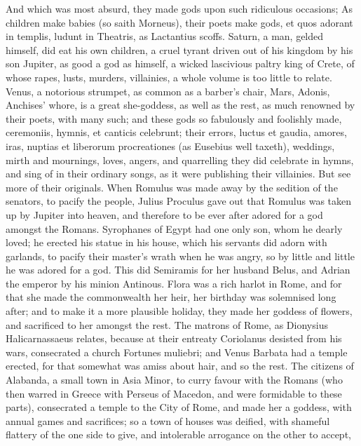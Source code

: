 {And which was most absurd, they made gods upon such ridiculous
occasions; As children make babies (so saith Morneus), their
poets make gods, et quos adorant in templis, ludunt in Theatris, as
Lactantius scoffs. Saturn, a man, gelded himself, did eat his own
children, a cruel tyrant driven out of his kingdom by his son Jupiter,
as good a god as himself, a wicked lascivious paltry king of Crete, of
whose rapes, lusts, murders, villainies, a whole volume is too little
to relate. Venus, a notorious strumpet, as common as a barber's chair,
Mars, Adonis, Anchises' whore, is a great she-goddess, as well as the
rest, as much renowned by their poets, with many such; and these gods
so fabulously and foolishly made, ceremoniis, hymnis, et canticis
celebrunt; their errors, luctus et gaudia, amores, iras, nuptias et
liberorum procreationes (as Eusebius well taxeth), weddings,
mirth and mournings, loves, angers, and quarrelling they did celebrate
in hymns, and sing of in their ordinary songs, as it were publishing
their villainies. But see more of their originals. When Romulus was
made away by the sedition of the senators, to pacify the people,
Julius Proculus gave out that Romulus was taken up by Jupiter
into heaven, and therefore to be ever after adored for a god amongst
the Romans. Syrophanes of Egypt had one only son, whom he dearly loved;
he erected his statue in his house, which his servants did adorn with
garlands, to pacify their master's wrath when he was angry, so by
little and little he was adored for a god. This did Semiramis for her
husband Belus, and Adrian the emperor by his minion Antinous. Flora was
a rich harlot in Rome, and for that she made the commonwealth her heir,
her birthday was solemnised long after; and to make it a more plausible
holiday, they made her goddess of flowers, and sacrificed to her
amongst the rest. The matrons of Rome, as Dionysius Halicarnassaeus
relates, because at their entreaty Coriolanus desisted from his wars,
consecrated a church Fortunes muliebri; and Venus Barbata had a
temple erected, for that somewhat was amiss about hair, and so the
rest. The citizens of Alabanda, a small town in Asia Minor, to
curry favour with the Romans (who then warred in Greece with Perseus of
Macedon, and were formidable to these parts), consecrated a temple to
the City of Rome, and made her a goddess, with annual games and
sacrifices; so a town of houses was deified, with shameful flattery of
the one side to give, and intolerable arrogance on the other to accept,
}
